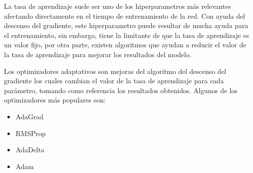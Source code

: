 La tasa de aprendizaje suele ser uno de los hiperparametros más relevantes afectando directamente en el tiempo de entrenamiento de la red. Con ayuda del descenso del gradiente, este hiperparametro puede resultar de mucha ayuda para el entrenamiento, sin embargo, tiene la limitante de que la tasa de aprendizaje es un valor fijo, por otra parte, existen algoritmos que ayudan a reducir el valor de la tasa de aprendizaje para mejorar los resultados del modelo.

Los optimizadores adaptativos son mejoras del algoritmo del descenso del gradiente los cuales cambian el valor de la tasa de aprendizaje para cada parámetro, tomando como referencia los resultados obtenidos. Algunos de los optimizadores más populares son:

\begin{itemize}
    \item AdaGrad
    \item RMSProp
    \item AdaDelta
    \item Adam
\end{itemize}
